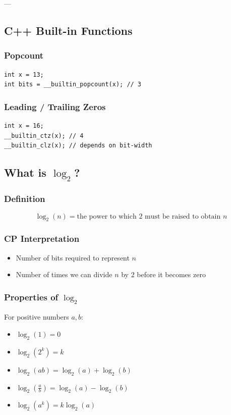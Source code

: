 \documentclass[11pt]{article}
\begin{document}
---


\subsection{C++ Built-in Functions}

\subsubsection{Popcount}
\begin{lstlisting}
int x = 13;
int bits = __builtin_popcount(x); // 3
\end{lstlisting}

\subsubsection{Leading / Trailing Zeros}
\begin{lstlisting}
int x = 16;
__builtin_ctz(x); // 4
__builtin_clz(x); // depends on bit-width
\end{lstlisting}

\subsection{What is $\log_2$?}

\subsubsection{Definition}
\[
\log_2(n) = \text{the power to which 2 must be raised to obtain } n
\]

\subsubsection{CP Interpretation}
\begin{itemize}
    \item Number of bits required to represent $n$
    \item Number of times we can divide $n$ by 2 before it becomes zero
\end{itemize}

\subsubsection{Properties of $\log_2$}

For positive numbers $a, b$:

\begin{itemize}
    \item $\log_2(1) = 0$
    \item $\log_2(2^k) = k$
    \item $\log_2(ab) = \log_2(a) + \log_2(b)$
    \item $\log_2\!\left(\frac{a}{b}\right) = \log_2(a) - \log_2(b)$
    \item $\log_2(a^k) = k \log_2(a)$
\end{itemize}
\end{document}
